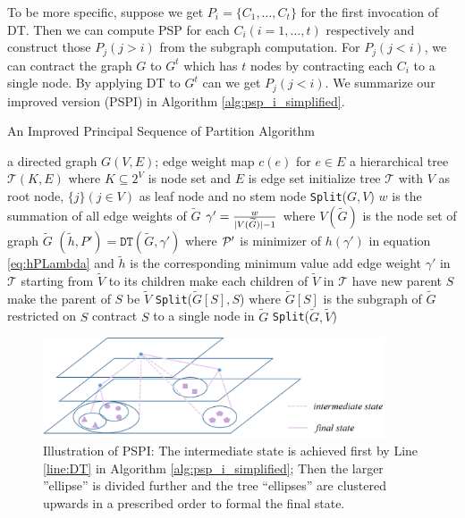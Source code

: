 To be more specific, suppose we get $P_i = \{C_1, \dots, C_t\}$ for the first invocation of DT. Then we can compute PSP for each $C_i(i=1,\dots, t)$ respectively and construct those $P_j(j>i)$ from the subgraph computation. For $P_j(j<i)$, we can contract the graph $G$  to $G^t$ which has $t$ nodes by contracting each $C_i$ to a single node. By applying DT to $G^t$ can we get $P_j(j<i)$. We summarize our improved version (PSPI) in Algorithm \ref{alg:psp_i_simplified}.

\begin{algorithm}
	\caption{An Improved Principal Sequence of Partition Algorithm}\label{alg:psp_i_simplified}
	\begin{algorithmic}[1]
		\REQUIRE a directed graph $G(V, E)$; edge weight map $c(e)$ for $e\in E$
		\ENSURE a hierarchical tree $\mathcal{T}(K, E)$ where $K \subseteq 2^{V}$ is node set and $E$ is edge set
		\STATE initialize tree $\mathcal{T}$ with $V$ as root node, $\{j\}(j \in V)$ as leaf node and no stem node
		\STATE \texttt{Split}($G, V$)
		\STATE $w$ is the summation of all edge weights of $\widetilde{G}$ 
		\STATE $\gamma' = \frac{w}{\abs{V(\widetilde{G})}-1}$ where $V(\widetilde{G})$ is the node set of graph $\widetilde{G}$ \label{alg:gamma_apostrophe}
		\STATE $(\tilde{h}, P') = \texttt{DT}(\widetilde{G}, \gamma')$ where $\P'$ is minimizer of $h(\gamma')$ in equation \eqref{eq:hPLambda} and $\tilde{h}$ is the corresponding minimum value  \label{line:DT}
		\STATE add edge weight $\gamma'$ in $\mathcal{T}$ starting from $\widetilde{V}$ to its children
		\ELSE
		\STATE make each children of $\widetilde{V}$ in $\mathcal{T}$ have new parent $S$		
		\STATE make the parent of $S$ be $\widetilde{V}$
		\STATE \texttt{Split}($\widetilde{G}[S], S$) where $\widetilde{G}[S]$ is the subgraph of $\widetilde{G}$ restricted on $S$
		\STATE contract $S$ to a single node in $\widetilde{G}$ %
		\ENDFOR 
		\STATE \texttt{Split}($\widetilde{G}, \widetilde{V}$)		
		\ENDIF
		\ENDFUNCTION
	\end{algorithmic}
\end{algorithm}

\begin{figure}
\centering
\includegraphics[width=0.9\textwidth]{improved_alg.png}
\caption{Illustration of PSPI: The intermediate state is achieved first by Line \ref{line:DT} in Algorithm \ref{alg:psp_i_simplified};
Then the larger ''ellipse'' is divided further and the tree ``ellipses'' are clustered upwards in a prescribed order to formal the final state.}\label{fig:pspi}
\end{figure}

